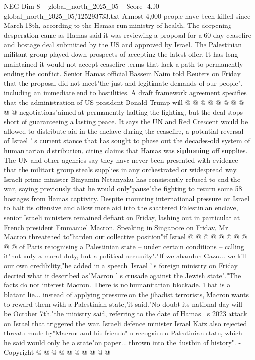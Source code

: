\begin{textsample}{NEG Dim 8 – global\_north\_2025\_05 – Score -4.00 – global\_north\_2025\_05/125293733.txt}
Almost 4,000 people have been killed since March 18th, according to the Hamas-run ministry of health.
The deepening desperation came as Hamas said it was reviewing a proposal for a 60-day ceasefire and hostage deal submitted by the US and approved by Israel.
The Palestinian militant group played down prospects of accepting the latest offer.
It has long maintained it would not accept ceasefire terms that lack a path to permanently ending the conflict.
Senior Hamas official Bassem Naim told Reuters on Friday that the proposal did not meet"the just and legitimate demands of our people", including an immediate end to hostilities.
A draft framework agreement specifies that the administration of US president Donald Trump will @ @ @ @ @ @ @ @ @ @ negotiations"aimed at permanently halting the fighting, but the deal stops short of guaranteeing a lasting peace.
It says the UN and Red Crescent would be allowed to distribute aid in the enclave during the ceasefire, a potential reversal of Israel ' s current stance that has sought to phase out the decades-old system of humanitarian distribution, citing claims that Hamas was \textbf{siphoning} off supplies.
The UN and other agencies say they have never been presented with evidence that the militant group steals supplies in any orchestrated or widespread way.
Israeli prime minister Binyamin Netanyahu has consistently refused to end the war, saying previously that he would only"pause"the fighting to return some 58 hostages from Hamas captivity.
Despite mounting international pressure on Israel to halt its offensive and allow more aid into the shattered Palestinian enclave, senior Israeli ministers remained defiant on Friday, lashing out in particular at French president Emmanuel Macron.
Speaking in Singapore on Friday, Mr Macron threatened to"harden our collective position"if Israel @ @ @ @ @ @ @ @ @ @ of Paris recognising a Palestinian state -- under certain conditions -- calling it"not only a moral duty, but a political necessity"."If we abandon Gaza... we kill our own credibility,"he added in a speech.
Israel ' s foreign ministry on Friday decried what it described as"Macron ' s crusade against the Jewish state"."The facts do not interest Macron.
There is no humanitarian blockade.
That is a blatant lie... instead of applying pressure on the jihadist terrorists, Macron wants to reward them with a Palestinian state,"it said."No doubt its national day will be October 7th,"the ministry said, referring to the date of Hamas ' s 2023 attack on Israel that triggered the war.
Israeli defence minister Israel Katz also rejected threats made by"Macron and his friends"to recognise a Palestinian state, which he said would only be a state"on paper... thrown into the dustbin of history". - Copyright @ @ @ @ @ @ @ @ @ @

\end{textsample}
